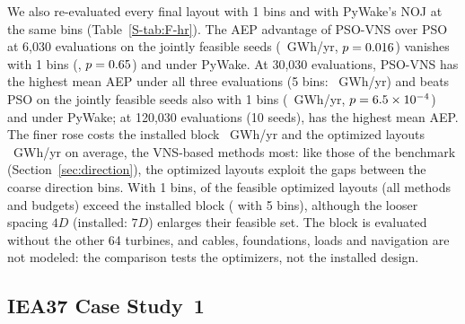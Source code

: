 We also re-evaluated every final layout with 1\textdegree{} bins and with PyWake's NOJ at the same bins (Table~\ref{S-tab:F-hr}). The AEP advantage of PSO-VNS over PSO at 6,030 evaluations on the \NFHRPairSixKOneN{} jointly feasible seeds (\NFHRPairSixKFive~GWh/yr, $p=0.016$) vanishes with 1\textdegree{} bins (\NFHRPairSixKOne, $p=0.65$) and under PyWake. At 30,030 evaluations, PSO-VNS has the highest mean AEP under all three evaluations (5\textdegree{} bins: \NHRMeanThirtyKPSOVNS~GWh/yr) and beats PSO on the \NFHRPairThirtyKOneN{} jointly feasible seeds also with 1\textdegree{} bins (\NFHRPairThirtyKOne~GWh/yr, $p=6.5\times10^{-4}$) and under PyWake; at 120,030 evaluations (10 seeds), \NHRBestHundredTwentyK{} has the highest mean AEP. The finer rose costs the installed block \NFHRInstDrop~GWh/yr and the optimized layouts \NFHRMeanDrop~GWh/yr on average, the VNS-based methods most: like those of the benchmark (Section~\ref{sec:direction}), the optimized layouts exploit the gaps between the coarse direction bins. With 1\textdegree{} bins, \NFHRAboveOneTotal{} of the \NFHRNFeas{} feasible optimized layouts (all methods and budgets) exceed the installed block (\NFHRAboveFiveTotal{} with 5\textdegree{} bins), although the looser spacing $4D$ (installed: $7D$) enlarges their feasible set. The block is evaluated without the other 64 turbines, and cables, foundations, loads and navigation are not modeled: the comparison tests the optimizers, not the installed design.

\subsection{IEA37 Case Study~1}
\label{sec:iea37}


